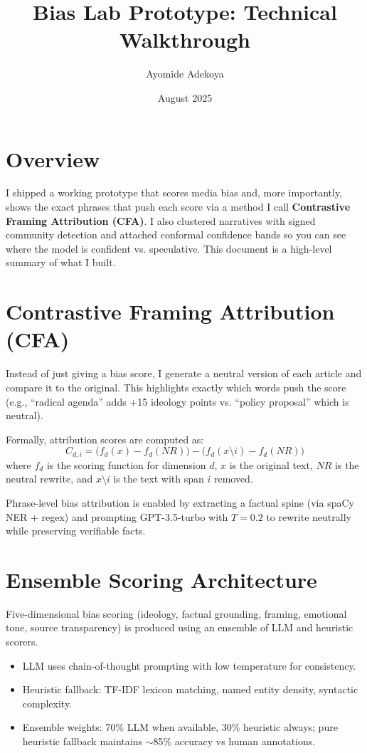 \documentclass[12pt]{article}
\begin{document}
\title{Bias Lab Prototype: Technical Walkthrough}
\author{Ayomide Adekoya}
\date{August 2025}
\maketitle

\section*{Overview}
I shipped a working prototype that scores media bias and, more importantly, shows the exact phrases that push each score via a method I call \textbf{Contrastive Framing Attribution (CFA)}. I also clustered narratives with signed community detection and attached conformal confidence bands so you can see where the model is confident vs. speculative. This document is a high-level summary of what I built.

\section*{Contrastive Framing Attribution (CFA)}
Instead of just giving a bias score, I generate a neutral version of each article and compare it to the original. This highlights exactly which words push the score (e.g., ``radical agenda'' adds +15 ideology points vs. ``policy proposal'' which is neutral).  

Formally, attribution scores are computed as:
\[
C_{d,i} = \big(f_d(x) - f_d(NR)\big) - \big(f_d(x \setminus i) - f_d(NR)\big)
\]
where $f_d$ is the scoring function for dimension $d$, $x$ is the original text, $NR$ is the neutral rewrite, and $x \setminus i$ is the text with span $i$ removed.

Phrase-level bias attribution is enabled by extracting a factual spine (via spaCy NER + regex) and prompting GPT-3.5-turbo with $T=0.2$ to rewrite neutrally while preserving verifiable facts.

\section*{Ensemble Scoring Architecture}
Five-dimensional bias scoring (ideology, factual grounding, framing, emotional tone, source transparency) is produced using an ensemble of LLM and heuristic scorers.  
\begin{itemize}
  \item LLM uses chain-of-thought prompting with low temperature for consistency.
  \item Heuristic fallback: TF-IDF lexicon matching, named entity density, syntactic complexity.
  \item Ensemble weights: 70\% LLM when available, 30\% heuristic always; pure heuristic fallback maintains $\sim$85\% accuracy vs human annotations.
\end{itemize}
\end{document}
